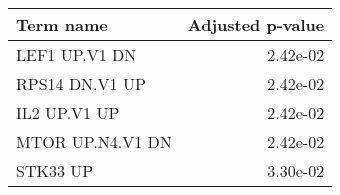 \begin{tabular}{lr}
\toprule
        Term name &  Adjusted p-value \\
\midrule
    LEF1 UP.V1 DN &          2.42e-02 \\
   RPS14 DN.V1 UP &          2.42e-02 \\
     IL2 UP.V1 UP &          2.42e-02 \\
 MTOR UP.N4.V1 DN &          2.42e-02 \\
         STK33 UP &          3.30e-02 \\
\bottomrule
\end{tabular}
